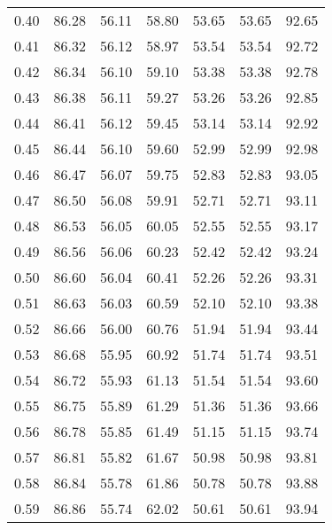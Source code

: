 \begin{tabular}{|c|c|c|c|c|c|c|}
      0.40 &     86.28 &     56.11 &      58.80 &   53.65 &      53.65 &         92.65 \\
      0.41 &     86.32 &     56.12 &      58.97 &   53.54 &      53.54 &         92.72 \\
      0.42 &     86.34 &     56.10 &      59.10 &   53.38 &      53.38 &         92.78 \\
      0.43 &     86.38 &     56.11 &      59.27 &   53.26 &      53.26 &         92.85 \\
      0.44 &     86.41 &     56.12 &      59.45 &   53.14 &      53.14 &         92.92 \\
      0.45 &     86.44 &     56.10 &      59.60 &   52.99 &      52.99 &         92.98 \\
      0.46 &     86.47 &     56.07 &      59.75 &   52.83 &      52.83 &         93.05 \\
      0.47 &     86.50 &     56.08 &      59.91 &   52.71 &      52.71 &         93.11 \\
      0.48 &     86.53 &     56.05 &      60.05 &   52.55 &      52.55 &         93.17 \\
      0.49 &     86.56 &     56.06 &      60.23 &   52.42 &      52.42 &         93.24 \\
      0.50 &     86.60 &     56.04 &      60.41 &   52.26 &      52.26 &         93.31 \\
      0.51 &     86.63 &     56.03 &      60.59 &   52.10 &      52.10 &         93.38 \\
      0.52 &     86.66 &     56.00 &      60.76 &   51.94 &      51.94 &         93.44 \\
      0.53 &     86.68 &     55.95 &      60.92 &   51.74 &      51.74 &         93.51 \\
      0.54 &     86.72 &     55.93 &      61.13 &   51.54 &      51.54 &         93.60 \\
      0.55 &     86.75 &     55.89 &      61.29 &   51.36 &      51.36 &         93.66 \\
      0.56 &     86.78 &     55.85 &      61.49 &   51.15 &      51.15 &         93.74 \\
      0.57 &     86.81 &     55.82 &      61.67 &   50.98 &      50.98 &         93.81 \\
      0.58 &     86.84 &     55.78 &      61.86 &   50.78 &      50.78 &         93.88 \\
      0.59 &     86.86 &     55.74 &      62.02 &   50.61 &      50.61 &         93.94 \\

\end{tabular}
